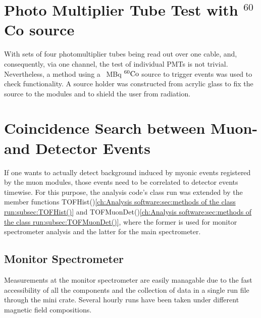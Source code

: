   \section{Photo Multiplier Tube Test with $^{60}$Co source} %
  \label{ch:Analysis:sec:PhotoMultiplierTests}
  
  With sets of four photomultiplier tubes being read out over one cable, and, consequently, via one channel, the test of individual PMTs is not trivial. Nevertheless, a method using a \SI{}{\mega\becquerel} $\rm ^{60}Co$ source to trigger events was used to check functionality. A source holder was constructed from acrylic glass to fix the source to the modules and to shield the user from radiation.
  
  \section{Coincidence Search between Muon- and Detector Events}
  \label{ch:Analysis:sec:Monitor Spectrometer Measurements}
  If one wants to actually detect background induced by myonic events registered by the muon modules, those events need to be correlated to detector events timewise. For this purpose, the analysis code's class run was extended by the member functions TOFHist()\ref{ch:Analysis software:sec:methods of the class run:subsec:TOFHist()} and TOFMuonDet()\ref{ch:Analysis software:sec:methods of the class run:subsec:TOFMuonDet()}, where the former is used for monitor spectrometer analysis and the latter for the main spectrometer. 
  
  \subsection{Monitor Spectrometer}
  \label{ch:Analysis:sec:Monitor Spectrometer Measurements:subsec:Monitor Spectrometer}
  
  Measurements at the monitor spectrometer are easily managable due to the fast accessibility of all the components and the collection of data in a single run file through the mini crate.
  Several hourly runs have been taken under different magnetic field compositions.
